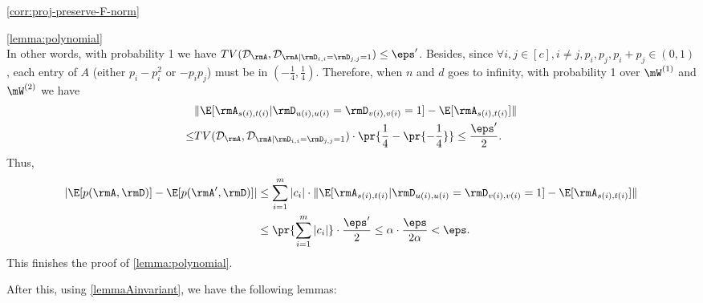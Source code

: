 \begin{proofof}{\cref{corr:proj-preserve-F-norm}}
\begin{proofof}{\cref{lemma:polynomial}}
\begin{equation}
\end{equation}
In other words, with probability 1 we have $TV(\mathcal{D}_{\rmA},\mathcal{D}_{\rmA|\rmD_{i,i}=\rmD_{j,j}=1})\leq \eps'$. Besides, since $\forall i,j\in[c], i\neq j, p_i,p_j, p_i+p_j\in(0,1)$, each entry of $A$ (either $p_i-p_i^2$ or $-p_ip_j$) must be in $(-\frac14,\frac14)$. Therefore, when $n$ and $d$ goes to infinity, with probability 1 over $\mW^{(1)}$ and $\mW^{(2)}$ we have
\begin{equation}\begin{split}
    &\|\E[\rmA_{s(i),t(i)}|\rmD_{u(i),u(i)}=\rmD_{v(i),v(i)}=1] - \E[\rmA_{s(i),t(i)}]\|\\
\leq&TV(\mathcal{D}_{\rmA},\mathcal{D}_{\rmA|\rmD_{i,i}=\rmD_{j,j}=1})\cdot\pr{\frac14-\pr{-\frac14}}\leq\frac{\eps'}{2}.
\end{split}\end{equation}
Thus,
\begin{equation}\begin{split}
    |\E[p(\rmA,\rmD)]-\E[p(\rmA',\rmD)]|&\leq\sum_{i=1}^m|c_i|\cdot\|\E[\rmA_{s(i),t(i)}|\rmD_{u(i),u(i)}=\rmD_{v(i),v(i)}=1] - \E[\rmA_{s(i),t(i)}]\|\\
                                        &\leq\pr{\sum_{i=1}^m|c_i|}\cdot \frac{\eps'}{2}\leq\alpha\cdot\frac{\eps}{2\alpha}<\eps.
\end{split}\end{equation}
This finishes the proof of \cref{lemma:polynomial}.
\end{proofof}
After this, using \cref{lemmaAinvariant}, we have the following lemmas:


\end{proofof}
